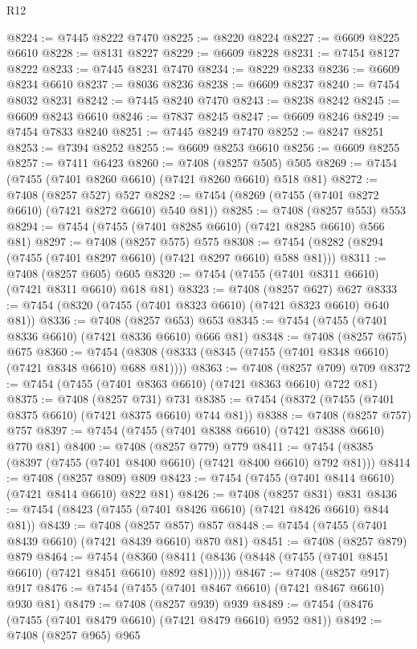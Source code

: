\begin{lexlean}{R12}
\begin{coremodule}
@8224 := @7445 @8222 @7470
@8225 := @8220 @8224
@8227 := @6609 @8225 @6610
@8228 := @8131 @8227
@8229 := @6609 @8228
@8231 := @7454 @8127 @8222
@8233 := @7445 @8231 @7470
@8234 := @8229 @8233
@8236 := @6609 @8234 @6610
@8237 := @8036 @8236
@8238 := @6609 @8237
@8240 := @7454 @8032 @8231
@8242 := @7445 @8240 @7470
@8243 := @8238 @8242
@8245 := @6609 @8243 @6610
@8246 := @7837 @8245
@8247 := @6609 @8246
@8249 := @7454 @7833 @8240
@8251 := @7445 @8249 @7470
@8252 := @8247 @8251
@8253 := @7394 @8252
@8255 := @6609 @8253 @6610
@8256 := @6609 @8255
@8257 := @7411 @6423
@8260 := @7408 (@8257 @505) @505
@8269 := @7454 (@7455 (@7401 @8260 @6610) (@7421 @8260 @6610) @518 @81)
@8272 := @7408 (@8257 @527) @527
@8282 := @7454 (@8269 (@7455 (@7401 @8272 @6610) (@7421 @8272 @6610) @540 @81))
@8285 := @7408 (@8257 @553) @553
@8294 := @7454 (@7455 (@7401 @8285 @6610) (@7421 @8285 @6610) @566 @81)
@8297 := @7408 (@8257 @575) @575
@8308 := @7454 (@8282 (@8294 (@7455 (@7401 @8297 @6610) (@7421 @8297 @6610) @588 @81)))
@8311 := @7408 (@8257 @605) @605
@8320 := @7454 (@7455 (@7401 @8311 @6610) (@7421 @8311 @6610) @618 @81)
@8323 := @7408 (@8257 @627) @627
@8333 := @7454 (@8320 (@7455 (@7401 @8323 @6610) (@7421 @8323 @6610) @640 @81))
@8336 := @7408 (@8257 @653) @653
@8345 := @7454 (@7455 (@7401 @8336 @6610) (@7421 @8336 @6610) @666 @81)
@8348 := @7408 (@8257 @675) @675
@8360 := @7454 (@8308 (@8333 (@8345 (@7455 (@7401 @8348 @6610) (@7421 @8348 @6610) @688 @81))))
@8363 := @7408 (@8257 @709) @709
@8372 := @7454 (@7455 (@7401 @8363 @6610) (@7421 @8363 @6610) @722 @81)
@8375 := @7408 (@8257 @731) @731
@8385 := @7454 (@8372 (@7455 (@7401 @8375 @6610) (@7421 @8375 @6610) @744 @81))
@8388 := @7408 (@8257 @757) @757
@8397 := @7454 (@7455 (@7401 @8388 @6610) (@7421 @8388 @6610) @770 @81)
@8400 := @7408 (@8257 @779) @779
@8411 := @7454 (@8385 (@8397 (@7455 (@7401 @8400 @6610) (@7421 @8400 @6610) @792 @81)))
@8414 := @7408 (@8257 @809) @809
@8423 := @7454 (@7455 (@7401 @8414 @6610) (@7421 @8414 @6610) @822 @81)
@8426 := @7408 (@8257 @831) @831
@8436 := @7454 (@8423 (@7455 (@7401 @8426 @6610) (@7421 @8426 @6610) @844 @81))
@8439 := @7408 (@8257 @857) @857
@8448 := @7454 (@7455 (@7401 @8439 @6610) (@7421 @8439 @6610) @870 @81)
@8451 := @7408 (@8257 @879) @879
@8464 := @7454
    (@8360 (@8411 (@8436 (@8448 (@7455 (@7401 @8451 @6610) (@7421 @8451 @6610) @892 @81)))))
@8467 := @7408 (@8257 @917) @917
@8476 := @7454 (@7455 (@7401 @8467 @6610) (@7421 @8467 @6610) @930 @81)
@8479 := @7408 (@8257 @939) @939
@8489 := @7454 (@8476 (@7455 (@7401 @8479 @6610) (@7421 @8479 @6610) @952 @81))
@8492 := @7408 (@8257 @965) @965

\end{coremodule}
\end{lexlean}
